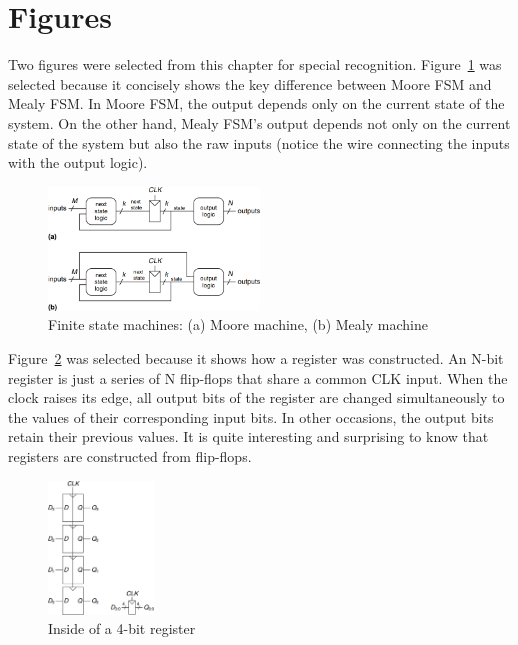 \documentclass[12pt]{article}
\begin{document}
\section{Figures}

Two figures were selected from this chapter for special recognition. Figure~\ref{figure:13} was selected because it concisely shows the key difference between Moore FSM and Mealy FSM. In Moore FSM, the output depends only on the current state of the system. On the other hand, Mealy FSM's output depends not only on the current state of the system but also the raw inputs (notice the wire connecting the inputs with the output logic).

\begin{figure}[h]
    \centering
    \includegraphics[width=0.5\textwidth]{moore_and_mealy_fsm.png}
    \caption{Finite state machines: (a) Moore machine, (b) Mealy machine}
    \label{figure:13}
\end{figure}

Figure~\ref{figure:14} was selected because it shows how a register was constructed. An N-bit register is just a series of N flip-flops that share a common CLK input. When the clock raises its edge, all output bits of the register are changed simultaneously to the values of their corresponding input bits. In other occasions, the output bits retain their previous values. It is quite interesting and surprising to know that registers are constructed from flip-flops.

\begin{figure}[h]
    \centering
    \includegraphics[width=0.25\textwidth]{register_4bit.png}
    \caption{Inside of a 4-bit register}
    \label{figure:14}
\end{figure}
\end{document}
